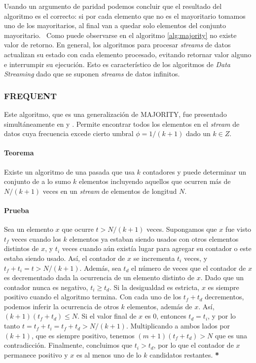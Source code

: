 \documentclass[a4paper,10pt, oneside]{article}
\begin{document}
Usando un argumento de paridad podemos concluir que el resultado del algoritmo es el correcto: si por cada elemento que no es el mayoritario tomamos uno de los mayoritarios, al final van a quedar solo elementos del conjunto mayoritario.
\
Como puede observarse en el algoritmo \ref{alg:majority} no existe valor de retorno. En general, los algoritmos para procesar \textit{streams} de datos actualizan su estado con cada elemento procesado, evitando retornar valor alguno e interrumpir su ejecución. Esto es característico de los algoritmos de \textit{Data Streaming} dado que se suponen \textit{streams} de datos infinitos.

\subsubsection{FREQUENT}\label{FREQUENT}

Este algoritmo, que es una generalización de MAJORITY, fue presentado simultáneamente en \cite{Karp:2003:SAF:762471.762473} y \cite{Demaine:2002:FEI:647912.740658}. Permite encontrar todos los elementos en el \textit{stream} de datos cuya frecuencia excede cierto umbral $\phi = 1/(k+1)$ dado un $k \in Z$. 

\paragraph{Teorema} Existe un algoritmo de una pasada que usa $k$ contadores y puede determinar un conjunto de a lo sumo $k$ elementos incluyendo aquellos que ocurren más de $N/(k+1)$ veces en un \textit{stream} de elementos de longitud $N$.


\paragraph{Prueba} Sea un elemento $x$ que ocurre $t > N/(k+1)$ veces. Supongamos que $x$ fue visto $t_f$ veces cuando los $k$ elementos ya estaban siendo usados con otros elementos distintos de $x$, y $t_i$ veces cuando aún existía lugar para agregar su contador o este estaba siendo usado. Así, el contador de $x$ se incrementa $t_i$ veces, y $t_f + t_i = t > N/(k+1)$. Además, sea $t_d$ el número de veces que el contador de $x$ es decrementado dada la ocurrencia de un elemento distinto de $x$. Dado que un contador nunca es negativo, $t_i \geq t_d$. Si la desigualdad es estricta, $x$ es siempre positivo cuando el algoritmo termina.
Con cada uno de los $t_f + t_d$ decrementos, podemos inferir la ocurrencia de otros $k$ elementos, además de $x$. Así, $(k+1)(t_f + t_d) \leq N$. Si el valor final de $x$ es $0$, entonces $t_d = t_i$, y por lo tanto $t = t_f + t_i = t_f + t_d > N/(k+1)$. Multiplicando a ambos lados por $(k+1)$, que es siempre positivo,  tenemos $(m+1)(t_f + t_d) > N$ que es una contradicción. Finalmente, concluimos que $t_i > t_d$, por lo que el contador de $x$ permanece positivo y $x$ es al menos uno de lo $k$ candidatos restantes. \textbf{*}
\end{document}
